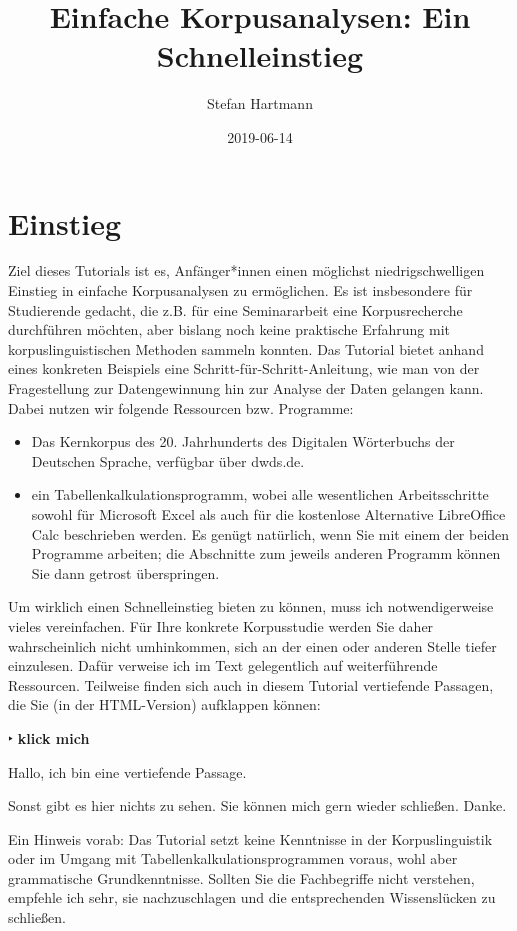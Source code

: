 \documentclass[]{article}
\title{Einfache Korpusanalysen: Ein Schnelleinstieg}
\author{Stefan Hartmann}
\date{2019-06-14}
\begin{document}
\maketitle

{
\setcounter{tocdepth}{4}
\tableofcontents
}
\section{Einstieg}\label{einstieg}

Ziel dieses Tutorials ist es, Anfänger*innen einen möglichst
niedrigschwelligen Einstieg in einfache Korpusanalysen zu ermöglichen.
Es ist insbesondere für Studierende gedacht, die z.B. für eine
Seminararbeit eine Korpusrecherche durchführen möchten, aber bislang
noch keine praktische Erfahrung mit korpuslinguistischen Methoden
sammeln konnten. Das Tutorial bietet anhand eines konkreten Beispiels
eine Schritt-für-Schritt-Anleitung, wie man von der Fragestellung zur
Datengewinnung hin zur Analyse der Daten gelangen kann. Dabei nutzen wir
folgende Ressourcen bzw. Programme:

\begin{itemize}
\item
  Das Kernkorpus des 20. Jahrhunderts des Digitalen Wörterbuchs der
  Deutschen Sprache, verfügbar über dwds.de.
\item
  ein Tabellenkalkulationsprogramm, wobei alle wesentlichen
  Arbeitsschritte sowohl für Microsoft Excel als auch für die kostenlose
  Alternative LibreOffice Calc beschrieben werden. Es genügt natürlich,
  wenn Sie mit einem der beiden Programme arbeiten; die Abschnitte zum
  jeweils anderen Programm können Sie dann getrost überspringen.
\end{itemize}

Um wirklich einen Schnelleinstieg bieten zu können, muss ich
notwendigerweise vieles vereinfachen. Für Ihre konkrete Korpusstudie
werden Sie daher wahrscheinlich nicht umhinkommen, sich an der einen
oder anderen Stelle tiefer einzulesen. Dafür verweise ich im Text
gelegentlich auf weiterführende Ressourcen. Teilweise finden sich auch
in diesem Tutorial vertiefende Passagen, die Sie (in der HTML-Version)
aufklappen können:

 ‣ \textbf{klick mich}

Hallo, ich bin eine vertiefende Passage.

Sonst gibt es hier nichts zu sehen. Sie können mich gern wieder
schließen. Danke.

Ein Hinweis vorab: Das Tutorial setzt keine Kenntnisse in der
Korpuslinguistik oder im Umgang mit Tabellenkalkulationsprogrammen
voraus, wohl aber grammatische Grundkenntnisse. Sollten Sie die
Fachbegriffe nicht verstehen, empfehle ich sehr, sie nachzuschlagen und
die entsprechenden Wissenslücken zu schließen.
\end{document}
